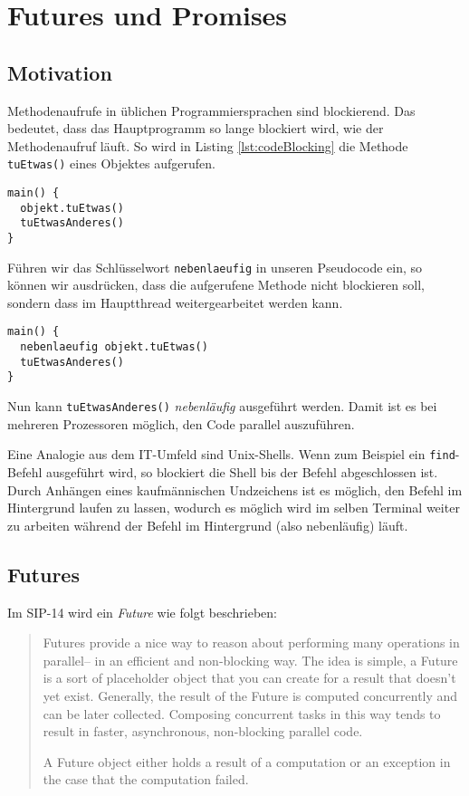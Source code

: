 \section{Futures und Promises}

\subsection{Motivation}

Methodenaufrufe in üblichen Programmiersprachen sind blockierend. Das bedeutet,
dass das Hauptprogramm so lange blockiert wird, wie der Methodenaufruf läuft.
So wird in Listing \ref{lst:codeBlocking} die Methode \texttt{tuEtwas()} eines Objektes aufgerufen.

\begin{lstlisting}[caption={Blockierender Methodenaufruf},label={lst:codeBlocking},captionpos=b]
main() {
  objekt.tuEtwas()
  tuEtwasAnderes()
}
\end{lstlisting}

Führen wir das Schlüsselwort \texttt{nebenlaeufig} in unseren Pseudocode ein,
so können wir ausdrücken, dass die aufgerufene Methode nicht blockieren soll,
sondern dass im Hauptthread weitergearbeitet werden kann.

\begin{lstlisting}[caption={Nebenläufiger Methodenaufruf},label={lst:codeConcurrent},captionpos=b]
main() {
  nebenlaeufig objekt.tuEtwas()
  tuEtwasAnderes()
}
\end{lstlisting}

Nun kann \texttt{tuEtwasAnderes()} \emph{nebenläufig} ausgeführt werden. Damit
ist es bei mehreren Prozessoren möglich, den Code parallel auszuführen.

Eine Analogie aus dem IT-Umfeld sind Unix-Shells. Wenn zum Beispiel ein
\texttt{find}-Befehl ausgeführt wird, so blockiert die Shell bis der Befehl
abgeschlossen ist. Durch Anhängen eines kaufmännischen Undzeichens ist es möglich,
den Befehl im Hintergrund laufen zu lassen, wodurch es möglich wird im selben
Terminal weiter zu arbeiten während der Befehl im Hintergrund (also nebenläufig)
läuft.

\subsection{Futures}

Im SIP-14 wird ein \emph{Future} wie folgt beschrieben:
\begin{quote}
Futures provide a nice way to reason about performing many operations in 
parallel– in an efficient and non-blocking way. The idea is simple, a Future 
is a sort of placeholder object that you can create for a result that doesn’t 
yet exist. Generally, the result of the Future is computed concurrently and can 
be later collected. Composing concurrent tasks in this way tends to result in 
faster, asynchronous, non-blocking parallel code.

A Future object either holds a result of a computation or an 
exception in the case that the computation failed.
\end{quote}

